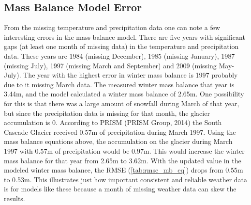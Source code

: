 \documentclass{article}
\begin{document}
\subsection{Mass Balance Model Error}
From the missing temperature and precipitation data one can note a few interesting errors in the mass balance model. There are five years 
with significant gaps (at least one month of missing data) in the temperature and precipitation data. These years are 1984 (missing December), 
1985 (missing January), 1987 (missing July), 1997 (missing March and September) and 2009 (missing May-July). The year with the highest error in 
winter mass balance is 1997 probably due to it missing March data. The measured winter mass balance that year is 3.44m, and the model calculated a 
winter mass balance of 2.65m. One possibility for this is that there was a large amount of snowfall during March of that year, but since the 
precipitation data is missing for that month, the glacier accumulation is 0. According to PRISM (PRISM Group, 2014) the South Cascade Glacier received 0.57m 
of precipitation during March 1997. Using the mass balance equations above, the accumulation on the glacier during March 1997 with 0.57m of 
precipitation would be 0.97m. This would increase the winter mass balance for that year from 2.65m to 3.62m. With the updated value in the modeled winter 
mass balance, the RMSE (\ref{tab:rmse_mb_eq}) drops from 0.55m to 0.53m. This 
illustrates just how important consistent and reliable weather data is for models like these because a month of missing weather data can skew the 
results.
\end{document}
